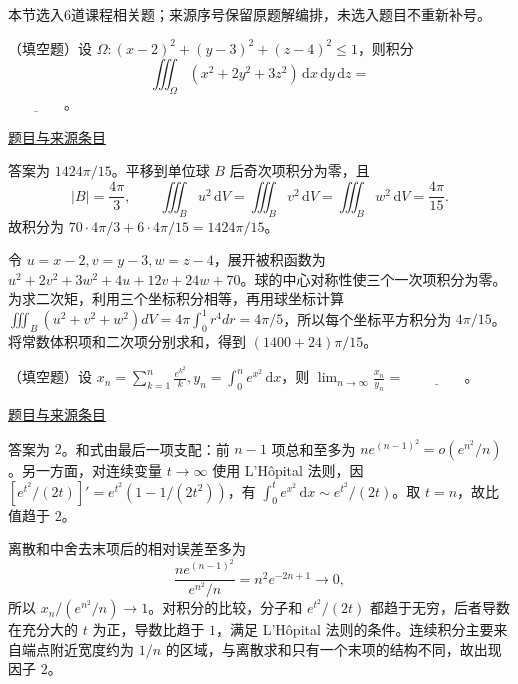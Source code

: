 \documentclass[12pt,fontset=fandol]{ctexart}
\begin{document}
本节选入6道课程相关题；来源序号保留原题解编排，未选入题目不重新补号。

\begin{example}[来源序号1]\label{ex:fin12-high:1}\label{pr:fin12-high:1}

（填空题）设 $\Omega:(x-2)^{2}+(y-3)^{2}+(z-4)^{2}\leq1$，则积分
\[
\iiint_{\Omega}\left(x^{2}+2y^{2}+3z^{2}\right)\,\mathrm{d}x\,\mathrm{d}y\,\mathrm{d}z=
\]
$\underline{\qquad\qquad}$。

\par\href{https://github.com/lzxcr/cmc-mathematics/blob/64916fa1fdbc3e444a652eca204d5669058ee321/src/problems/finals/12/01.md}{题目与来源条目}

\end{example}

\begin{solve}\label{ans:fin12-high:1}

答案为 $1424\pi/15$。平移到单位球 $B$ 后奇次项积分为零，且
\[
|B|=\frac{4\pi}{3},\qquad\iiint_Bu^2\,\mathrm dV=\iiint_Bv^2\,\mathrm dV=\iiint_Bw^2\,\mathrm dV=\frac{4\pi}{15}.
\]
故积分为 $70\cdot4\pi/3+6\cdot4\pi/15=1424\pi/15$。

令 $u=x-2,v=y-3,w=z-4$，展开被积函数为 $u^2+2v^2+3w^2+4u+12v+24w+70$。球的中心对称性使三个一次项积分为零。为求二次矩，利用三个坐标积分相等，再用球坐标计算 $\iiint_B(u^2+v^2+w^2)dV=4\pi\int_0^1r^4dr=4\pi/5$，所以每个坐标平方积分为 $4\pi/15$。将常数体积项和二次项分别求和，得到 $(1400+24)\pi/15$。

\end{solve}

\begin{example}[来源序号2]\label{ex:fin12-high:2}\label{pr:fin12-high:2}

（填空题）设 $x_{n}=\sum_{k=1}^{n}\frac{e^{k^{2}}}{k},y_{n}=\int_{0}^{n}e^{x^{2}}\,\mathrm{d}x$，则 $\lim_{n\to\infty}\frac{x_{n}}{y_{n}}=$ $\underline{\qquad\qquad}$。

\par\href{https://github.com/lzxcr/cmc-mathematics/blob/64916fa1fdbc3e444a652eca204d5669058ee321/src/problems/finals/12/02.md}{题目与来源条目}

\end{example}

\begin{solve}\label{ans:fin12-high:2}

答案为 $2$。和式由最后一项支配：前 $n-1$ 项总和至多为 $ne^{(n-1)^2}=o(e^{n^2}/n)$。另一方面，对连续变量 $t\to\infty$ 使用 L'Hôpital 法则，因 $[e^{t^2}/(2t)]'=e^{t^2}(1-1/(2t^2))$，有 $\int_0^te^{x^2}\,\mathrm dx\sim e^{t^2}/(2t)$。取 $t=n$，故比值趋于 $2$。

离散和中舍去末项后的相对误差至多为
\[
\frac{ne^{(n-1)^2}}{e^{n^2}/n}=n^2e^{-2n+1}\longrightarrow0,
\]
所以 $x_n/(e^{n^2}/n)\to1$。对积分的比较，分子和 $e^{t^2}/(2t)$ 都趋于无穷，后者导数在充分大的 $t$ 为正，导数比趋于 $1$，满足 L'Hôpital 法则的条件。连续积分主要来自端点附近宽度约为 $1/n$ 的区域，与离散求和只有一个末项的结构不同，故出现因子 $2$。

\end{solve}
\end{document}
